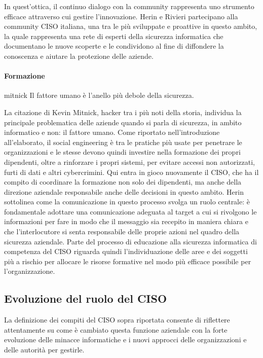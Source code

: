 In quest'ottica, il continuo dialogo con la community rappresenta uno strumento
efficace attraverso cui gestire l'innovazione. Herin e Rivieri partecipano alla community CISO
italiana, una tra le più sviluppate e proattive in questo ambito, la quale rappresenta
una rete di esperti della sicurezza informatica che documentano le nuove scoperte e le
condividono al fine di diffondere la conoscenza e aiutare la protezione delle aziende.

\paragraph{Formazione}
\begin{citazione}{mitnick}
    Il fattore umano è l'anello più debole della sicurezza.
\end{citazione}
La citazione di Kevin Mitnick, hacker tra i più noti della storia, individua
la principale problematica delle aziende quando si parla di sicurezza, in ambito
informatico e non: il fattore umano. Come riportato nell'introduzione all'elaborato, 
il social engineering è tra le pratiche più usate per penetrare
le organizzazioni e le stesse devono quindi investire nella formazione
dei propri dipendenti, oltre a rinforzare i propri sistemi, per evitare accessi
non autorizzati, furti di dati e altri cybercrimini. Qui entra in gioco nuovamente il CISO,
che ha il compito di coordinare la formazione non solo dei dipendenti, ma anche
della direzione aziendale responsabile anche delle decisioni in questo ambito.
Herin sottolinea come la comunicazione in questo processo svolga un ruolo centrale:
è fondamentale adottare una comunicazione adeguata al target a cui si rivolgono le informazioni
per fare in modo che il messaggio sia recepito in maniera chiara e che l'interlocutore
si senta responsabile delle proprie azioni nel quadro della sicurezza aziendale.
Parte del processo di educazione alla sicurezza informatica di competenza del CISO 
riguarda quindi l'individuazione delle aree e dei soggetti più a rischio per 
allocare le risorse formative nel modo più efficace possibile per l'organizzazione.


\subsection{Evoluzione del ruolo del CISO}
La definizione dei compiti del CISO sopra riportata consente di riflettere attentamente
su come è cambiato questa funzione aziendale con la forte evoluzione delle minacce informatiche
e i nuovi approcci delle organizzazioni e delle autorità per gestirle.

